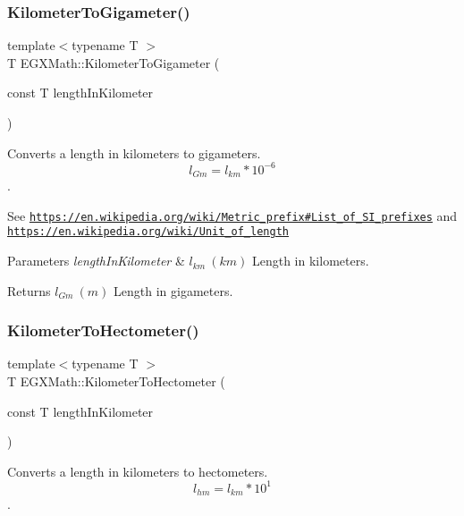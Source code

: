 \subsubsection{\texorpdfstring{Kilometer\+To\+Gigameter()}{KilometerToGigameter()}}
{\footnotesize\ttfamily template$<$typename T $>$ \\
T E\+G\+X\+Math\+::\+Kilometer\+To\+Gigameter (\begin{DoxyParamCaption}\item[{const T}]{length\+In\+Kilometer }\end{DoxyParamCaption})}



Converts a length in kilometers to gigameters. \[ l_{Gm}=l_{km} * 10^{-6} \]. 

See \href{https://en.wikipedia.org/wiki/Metric_prefix#List_of_SI_prefixes}{\tt https\+://en.\+wikipedia.\+org/wiki/\+Metric\+\_\+prefix\#\+List\+\_\+of\+\_\+\+S\+I\+\_\+prefixes} and \href{https://en.wikipedia.org/wiki/Unit_of_length}{\tt https\+://en.\+wikipedia.\+org/wiki/\+Unit\+\_\+of\+\_\+length} 
\begin{DoxyParams}{Parameters}
{\em length\+In\+Kilometer} & $ l_{km}\ (km)$ Length in kilometers. \\
\hline
\end{DoxyParams}
\begin{DoxyReturn}{Returns}
$ l_{Gm}\ (m)$ Length in gigameters. 
\end{DoxyReturn}
\mbox{\label{group___e_g_x_math-_conversions-_length_conversions-_kilometer-_s_i_ga43aeeda4346af2ec10e749d076d38bc3}} 
\subsubsection{\texorpdfstring{Kilometer\+To\+Hectometer()}{KilometerToHectometer()}}
{\footnotesize\ttfamily template$<$typename T $>$ \\
T E\+G\+X\+Math\+::\+Kilometer\+To\+Hectometer (\begin{DoxyParamCaption}\item[{const T}]{length\+In\+Kilometer }\end{DoxyParamCaption})}



Converts a length in kilometers to hectometers. \[ l_{hm}=l_{km} * 10^{1} \]. 

